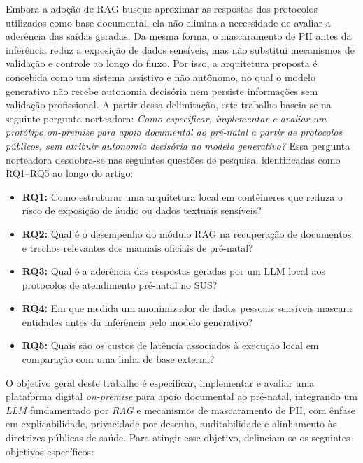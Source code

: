 \documentclass[12pt]{article}
\begin{document}
Embora a adoção de RAG busque aproximar as respostas dos protocolos utilizados como base documental, ela não elimina a necessidade de avaliar a aderência das saídas geradas. Da mesma forma, o mascaramento de PII antes da inferência reduz a exposição de dados sensíveis, mas não substitui mecanismos de validação e controle ao longo do fluxo. Por isso, a arquitetura proposta é concebida como um sistema assistivo e não autônomo, no qual o modelo generativo não recebe autonomia decisória nem persiste informações sem validação profissional. A partir dessa delimitação, este trabalho baseia-se na seguinte pergunta norteadora: \textit{Como especificar, implementar e avaliar um protótipo on-premise para apoio documental ao pré-natal a partir de protocolos públicos, sem atribuir autonomia decisória ao modelo generativo?}
Essa pergunta norteadora desdobra-se nas seguintes questões de pesquisa, identificadas como RQ1--RQ5 ao longo do artigo:
\begin{itemize}
\item \textbf{RQ1:} Como estruturar uma arquitetura local em contêineres que reduza o risco de exposição de áudio ou dados textuais sensíveis?
  \item \textbf{RQ2:} Qual é o desempenho do módulo RAG na recuperação de documentos e trechos relevantes dos manuais oficiais de pré-natal?
	\item \textbf{RQ3:} Qual é a aderência das respostas geradas por um LLM local aos protocolos de atendimento pré-natal no SUS?
	\item \textbf{RQ4:} Em que medida um anonimizador de dados pessoais sensíveis mascara entidades antes da inferência pelo modelo generativo?
	\item \textbf{RQ5:} Quais são os custos de latência associados à execução local em comparação com uma linha de base externa?
\end{itemize}


O objetivo geral deste trabalho é especificar, implementar e avaliar uma plataforma digital \textit{on-premise} para apoio documental ao pré-natal, integrando um \textit{LLM} fundamentado por \textit{RAG} e mecanismos de mascaramento de PII, com ênfase em explicabilidade, privacidade por desenho, auditabilidade e alinhamento às diretrizes públicas de saúde. Para atingir esse objetivo, delineiam-se os seguintes objetivos específicos:
\end{document}

